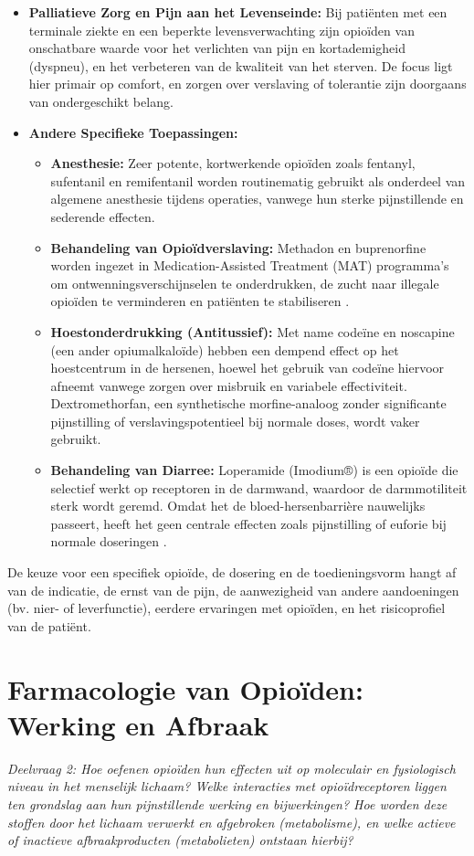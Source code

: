 \documentclass[11pt, a4paper]{report} %
\begin{document}
\begin{itemize}
    \item \textbf{Palliatieve Zorg en Pijn aan het Levenseinde:} Bij patiënten met een terminale ziekte en een beperkte levensverwachting zijn opioïden van onschatbare waarde voor het verlichten van pijn en kortademigheid (dyspneu), en het verbeteren van de kwaliteit van het sterven. De focus ligt hier primair op comfort, en zorgen over verslaving of tolerantie zijn doorgaans van ondergeschikt belang.
    \item \textbf{Andere Specifieke Toepassingen:}
        \begin{itemize}
            \item \textbf{Anesthesie:} Zeer potente, kortwerkende opioïden zoals fentanyl, sufentanil en remifentanil worden routinematig gebruikt als onderdeel van algemene anesthesie tijdens operaties, vanwege hun sterke pijnstillende en sederende effecten.
            \item \textbf{Behandeling van Opioïdverslaving:} Methadon en buprenorfine worden ingezet in Medication-Assisted Treatment (MAT) programma's om ontwenningsverschijnselen te onderdrukken, de zucht naar illegale opioïden te verminderen en patiënten te stabiliseren \parencite{Gupta2010ChemistryOpioids}.
            \item \textbf{Hoestonderdrukking (Antitussief):} Met name codeïne en noscapine (een ander opiumalkaloïde) hebben een dempend effect op het hoestcentrum in de hersenen, hoewel het gebruik van codeïne hiervoor afneemt vanwege zorgen over misbruik en variabele effectiviteit. Dextromethorfan, een synthetische morfine-analoog zonder significante pijnstilling of verslavingspotentieel bij normale doses, wordt vaker gebruikt.
            \item \textbf{Behandeling van Diarree:} Loperamide (Imodium®) is een opioïde die selectief werkt op receptoren in de darmwand, waardoor de darmmotiliteit sterk wordt geremd. Omdat het de bloed-hersenbarrière nauwelijks passeert, heeft het geen centrale effecten zoals pijnstilling of euforie bij normale doseringen \parencite{Gupta2010ChemistryOpioids}.
        \end{itemize}
\end{itemize}
De keuze voor een specifiek opioïde, de dosering en de toedieningsvorm hangt af van de indicatie, de ernst van de pijn, de aanwezigheid van andere aandoeningen (bv. nier- of leverfunctie), eerdere ervaringen met opioïden, en het risicoprofiel van de patiënt.


\chapter{Farmacologie van Opioïden: Werking en Afbraak}
\label{chap:farmacologie}
\textit{Deelvraag 2: Hoe oefenen opioïden hun effecten uit op moleculair en fysiologisch niveau in het menselijk lichaam? Welke interacties met opioïdreceptoren liggen ten grondslag aan hun pijnstillende werking en bijwerkingen? Hoe worden deze stoffen door het lichaam verwerkt en afgebroken (metabolisme), en welke actieve of inactieve afbraakproducten (metabolieten) ontstaan hierbij?}
\end{document}
